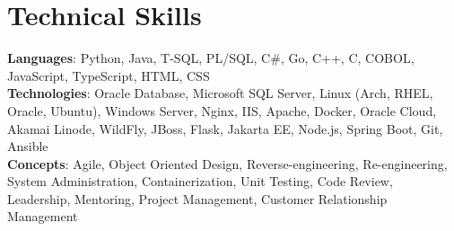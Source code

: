 \section{Technical Skills}
    \begin{itemize}[leftmargin=0.15in, label={}]
	\small{\item{
		\textbf{Languages}{: Python, Java, T-SQL, PL/SQL, C\#, Go, C++, C, COBOL, JavaScript, TypeScript, HTML, CSS} \\
		\textbf{Technologies}{: Oracle Database, Microsoft SQL Server, Linux (Arch, RHEL, Oracle, Ubuntu), Windows Server, Nginx, IIS, Apache, Docker, Oracle Cloud, Akamai Linode, WildFly, JBoss, Flask, Jakarta EE, Node.js, Spring Boot, Git, Ansible} \\
		\textbf{Concepts}{: Agile, Object Oriented Design, Reverse-engineering, Re-engineering, System Administration, Containerization, Unit Testing, Code Review, Leadership, Mentoring, Project Management, Customer Relationship Management}
	}}
    \end{itemize}
